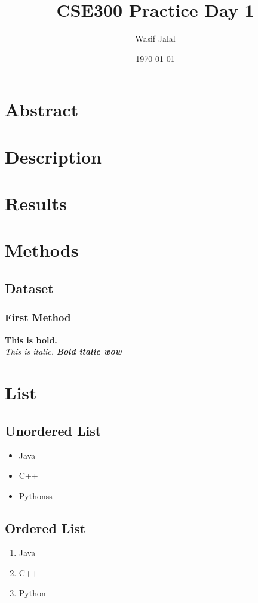 \documentclass[14pt, a4paper]{article}
\title{CSE300 Practice Day 1}
\author{Wasif Jalal}
\date{\today}
\begin{document}
\maketitle %

\section{Abstract}

\section{Description}
\section{Results}
\section{Methods}
\subsection{Dataset}
\subsubsection{First Method}

\textbf{This is bold.\\}
\textit{This is italic.}
\textbf{\textit{Bold italic wow}}

\section{List}
\subsection{Unordered List}
\begin{itemize}
    \item {Java}
    \item C++
    \item Pythonss
\end{itemize}

\subsection{Ordered List}
\begin{enumerate}
    \item {Java}
    \item C++
    \item Python
\end{enumerate}
\end{document}
